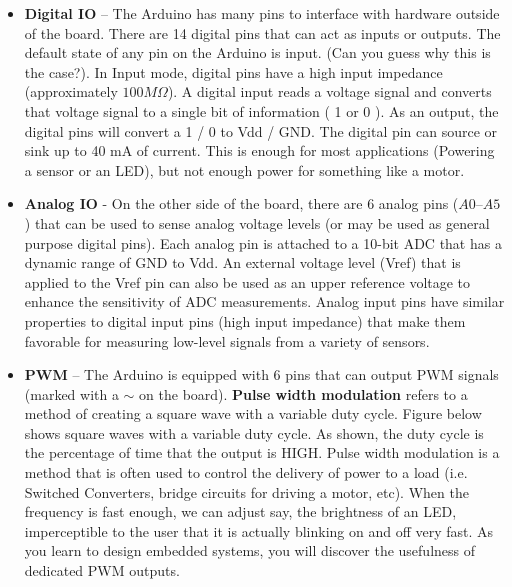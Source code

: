 \documentclass[10pt]{report}
\begin{document}
\begin{itemize}

\item \textbf{Digital IO} – The Arduino has many pins to interface with hardware outside of the board. There are 14 digital pins that can act as inputs or outputs. The default state of any pin on the Arduino is input. (Can you guess why this is the case?). In Input mode, digital pins have a high input impedance (approximately $100 M \Omega$). A digital input reads a voltage signal and converts that voltage signal to a single bit of information ( 1 or 0 ).  As an output, the digital pins will convert a 1 / 0 to Vdd / GND. The digital pin can source or sink up to 40 mA of current. This is enough for most applications (Powering a sensor or an LED), but not enough power for something like a motor.

\item \textbf{Analog IO} - On the other side of the board, there are 6 analog pins ($A0 – A5$) that can be used to sense analog voltage levels (or may be used as general purpose digital pins). Each analog pin is attached to a 10-bit ADC that has a dynamic range of GND to Vdd. An external voltage level (Vref) that is applied to the Vref pin can also be used as an upper reference voltage to enhance the sensitivity of ADC measurements. Analog input pins have similar properties to digital input pins (high input impedance) that make them favorable for measuring low-level signals from a variety of sensors.

\item \textbf{PWM} – The Arduino is equipped with 6 pins that can output PWM signals (marked with a $\sim$ on the board). \textbf{Pulse width modulation} refers to a method of creating a square wave with a variable duty cycle. Figure  below shows square waves with a variable duty cycle. As shown, the duty cycle is the percentage of time that the output is HIGH. Pulse width modulation is a method that is often used to control the delivery of power to a load (i.e. Switched Converters, bridge circuits for driving a motor, etc). When the frequency is fast enough, we can adjust say, the brightness of an LED, imperceptible to the user that it is actually blinking on and off very fast. As you learn to design embedded systems, you will discover the usefulness of dedicated PWM outputs.

\end{itemize}
\end{document}
